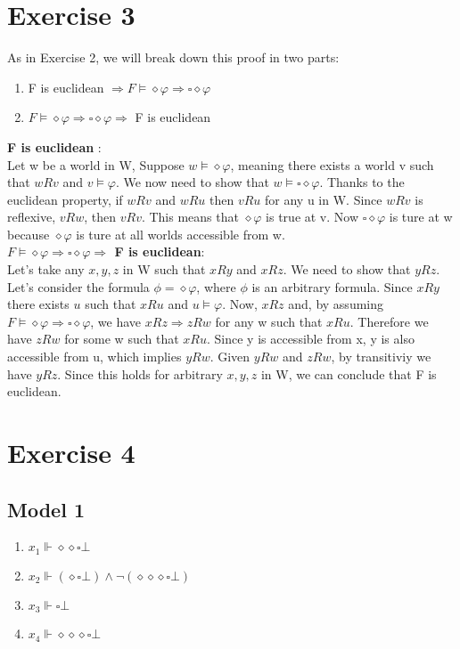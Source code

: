 \documentclass[11pt]{exam}
\begin{document}
\section*{Exercise 3}
As in Exercise 2, we will break down this proof in two parts:
\begin{enumerate}
    \item F is euclidean \(\Rightarrow F \vDash \diamond \varphi \Rightarrow \square \diamond \varphi\)
    \item \(F \vDash \diamond \varphi \Rightarrow \square \diamond \varphi \Rightarrow\) F is euclidean
\end{enumerate}
\textbf{F is euclidean} : \\
Let w be a world in W, Suppose \(w \vDash \diamond \varphi\), meaning there exists a world v such that \(wRv\) and \(v \vDash \varphi\).
We now need to show that \(w \vDash \square \diamond \varphi\). Thanks to the euclidean property, if \(wRv\) and \(wRu\) then \(vRu\) for any u in W.
Since \(wRv\) is reflexive, \(vRw\), then \(vRv\). This means that \(\diamond \varphi\) is true at v. Now \(\square \diamond \varphi\) is ture at w because \(\diamond \varphi\) is ture at all worlds accessible from w. \\
\textbf{\(F \vDash \diamond \varphi \Rightarrow \square \diamond \varphi \Rightarrow\) F is euclidean}: \\
Let's take any \(x, y, z\) in W such that \(xRy\) and \(xRz\). We need to show that \(yRz\).
Let's consider the formula \(\phi = \diamond \varphi\), where \(\phi\) is an arbitrary formula. Since \(xRy\) there exists \(u\) such that \(xRu\) and \(u \vDash \varphi\).
Now, \(xRz\) and, by assuming \(F \vDash \diamond \varphi \Rightarrow \square \diamond \varphi\), we have \(xRz \Rightarrow zRw\) for any w such that \(xRu\).
Therefore we have \(zRw\) for some w such that \(xRu\). Since y is accessible from x, y is also accessible from u, which implies \(yRw\).
Given \(yRw\) and \(zRw\), by transitiviy we have \(yRz\).
Since this holds for arbitrary \(x, y, z\) in W, we can conclude that F is euclidean.
\section*{Exercise 4}
\subsection*{Model 1}
\begin{enumerate}
    \item \(x_1 \Vdash \diamond \diamond \square \bot \)
    \item \(x_2 \Vdash (\diamond \square \bot) \wedge \neg (\diamond \diamond \diamond \square \bot) \)
    \item \(x_3 \Vdash \square \bot \)
    \item \(x_4 \Vdash \diamond \diamond \diamond \square \bot \)
\end{enumerate}
\end{document}
